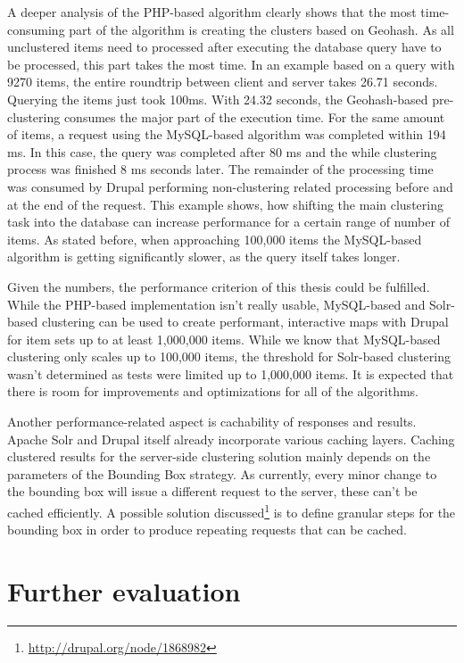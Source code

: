 A deeper analysis of the PHP-based algorithm clearly shows that the most time-consuming part of the algorithm is creating the clusters based on Geohash. As all unclustered items need to processed after executing the database query have to be processed, this part takes the most time. In an example based on a query with 9270 items, the entire roundtrip between client and server takes 26.71 seconds. Querying the items just took 100ms. With 24.32 seconds, the Geohash-based pre-clustering consumes the major part of the execution time. For the same amount of items, a request using the MySQL-based algorithm was completed within 194 ms. In this case, the query was completed after 80 ms and the while clustering process was finished 8 ms seconds later. The remainder of the processing time was consumed by Drupal performing non-clustering related processing before and at the end of the request. This example shows, how shifting the main clustering task into the database can increase performance for a certain range of number of items. As stated before, when approaching 100,000 items the MySQL-based algorithm is getting significantly slower, as the query itself takes longer.

Given the numbers, the performance criterion of this thesis could be fulfilled. While the PHP-based implementation isn't really usable, MySQL-based and Solr-based clustering can be used to create performant, interactive maps with Drupal for item sets up to at least 1,000,000 items. While we know that MySQL-based clustering only scales up to 100,000 items, the threshold for Solr-based clustering wasn't determined as tests were limited up to 1,000,000 items. It is expected that there is room for improvements and optimizations for all of the algorithms.

Another performance-related aspect is cachability of responses and results. Apache Solr and Drupal itself already incorporate various caching layers. Caching clustered results for the server-side clustering solution mainly depends on the parameters of the Bounding Box strategy. As currently, every minor change to the bounding box will issue a different request to the server, these can't be cached efficiently. A possible solution discussed\footnote{\url{http://drupal.org/node/1868982}} is to define granular steps for the bounding box in order to produce repeating requests that can be cached.  

\section{Further evaluation}

